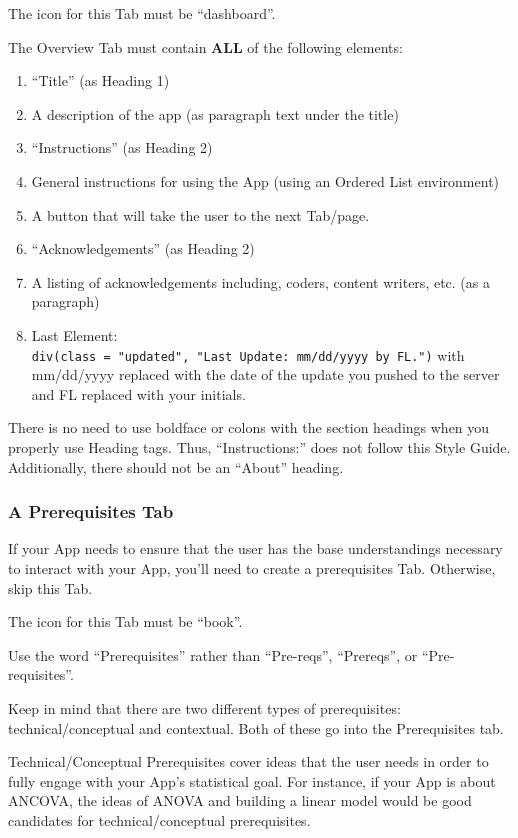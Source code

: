 \documentclass[
]{book}
\providecommand{\tightlist}{%
  \setlength{\itemsep}{0pt}\setlength{\parskip}{0pt}}
\begin{document}
The icon for this Tab must be ``dashboard''.

The Overview Tab must contain \textbf{ALL} of the following elements:

\begin{enumerate}
\def\labelenumi{\arabic{enumi}.}
\tightlist
\item
  ``Title'' (as Heading 1)
\item
  A description of the app (as paragraph text under the title)
\item
  ``Instructions'' (as Heading 2)
\item
  General instructions for using the App (using an Ordered List environment)
\item
  A button that will take the user to the next Tab/page.
\item
  ``Acknowledgements'' (as Heading 2)
\item
  A listing of acknowledgements including, coders, content writers, etc. (as a paragraph)
\item
  Last Element: \texttt{div(class\ =\ "updated",\ "Last\ Update:\ mm/dd/yyyy\ by\ FL.")} with mm/dd/yyyy replaced with the date of the update you pushed to the server and FL replaced with your initials.
\end{enumerate}

There is no need to use boldface or colons with the section headings when you properly use Heading tags. Thus, ``Instructions:'' does not follow this Style Guide. Additionally, there should not be an ``About'' heading.

\hypertarget{a-prerequisites-tab}{%
\subsubsection{A Prerequisites Tab}\label{a-prerequisites-tab}}

If your App needs to ensure that the user has the base understandings necessary to interact with your App, you'll need to create a prerequisites Tab. Otherwise, skip this Tab.

The icon for this Tab must be ``book''.

Use the word ``Prerequisites'' rather than ``Pre-reqs'', ``Prereqs'', or ``Pre-requisites''.

Keep in mind that there are two different types of prerequisites: technical/conceptual and contextual. Both of these go into the Prerequisites tab.

Technical/Conceptual Prerequisites cover ideas that the user needs in order to fully engage with your App's statistical goal. For instance, if your App is about ANCOVA, the ideas of ANOVA and building a linear model would be good candidates for technical/conceptual prerequisites.
\end{document}
